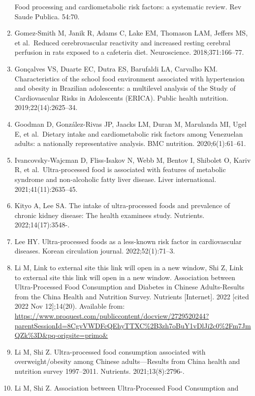 \documentclass[
]{article}
\begin{document}
\begin{enumerate}
  Food processing and cardiometabolic risk factors: a systematic review.
  Rev Saude Publica. 54:70.
\item
  Gomez-Smith M, Janik R, Adams C, Lake EM, Thomason LAM, Jeffers MS, et
  al.~Reduced cerebrovascular reactivity and increased resting cerebral
  perfusion in rats exposed to a cafeteria diet. Neuroscience.
  2018;371:166--77.
\item
  Gonçalves VS, Duarte EC, Dutra ES, Barufaldi LA, Carvalho KM.
  Characteristics of the school food environment associated with
  hypertension and obesity in Brazilian adolescents: a multilevel
  analysis of the Study of Cardiovascular Risks in Adolescents (ERICA).
  Public health nutrition. 2019;22(14):2625--34.
\item
  Goodman D, González-Rivas JP, Jaacks LM, Duran M, Marulanda MI, Ugel
  E, et al.~Dietary intake and cardiometabolic risk factors among
  Venezuelan adults: a nationally representative analysis. BMC
  nutrition. 2020;6(1):61--61.
\item
  Ivancovsky‐Wajcman D, Fliss‐Isakov N, Webb M, Bentov I, Shibolet O,
  Kariv R, et al.~Ultra‐processed food is associated with features of
  metabolic syndrome and non‐alcoholic fatty liver disease. Liver
  international. 2021;41(11):2635--45.
\item
  Kityo A, Lee SA. The intake of ultra-processed foods and prevalence of
  chronic kidney disease: The health examinees study. Nutrients.
  2022;14(17):3548-.
\item
  Lee HY. Ultra-processed foods as a less-known risk factor in
  cardiovascular diseases. Korean circulation journal. 2022;52(1):71--3.
\item
  Li M, Link to external site this link will open in a new window, Shi
  Z, Link to external site this link will open in a new window.
  Association between Ultra-Processed Food Consumption and Diabetes in
  Chinese Adults-Results from the China Health and Nutrition Survey.
  Nutrients {[}Internet{]}. 2022 {[}cited 2022 Nov 12{]};14(20).
  Available from:
  \url{https://www.proquest.com/publiccontent/docview/2729520244?parentSessionId=8CgvVWDFcQEhyTTXC\%2B3zh7oBuY1vDlJi2c0\%2Fm7JmQZk\%3D\&pq-origsite=primo\&}
\item
  Li M, Shi Z. Ultra-processed food consumption associated with
  overweight/obesity among Chinese adults---Results from China health
  and nutrition survey 1997--2011. Nutrients. 2021;13(8):2796-.
\item
  Li M, Shi Z. Association between Ultra-Processed Food Consumption and

\end{enumerate}
\end{document}
